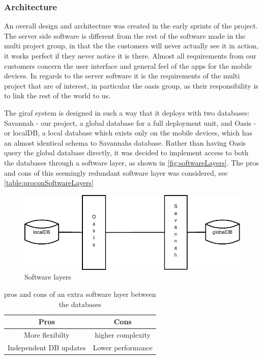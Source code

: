 \subsubsection*{Architecture}
An overall design and architecture was created in the early sprints of the project.
The server side software is different from the rest of the software made in the multi project group, in that the the customers will never actually see it in action, it works perfect if they never notice it is there.
Almost all requirements from our customers concern the user interface and general feel of the apps for the mobile devices. In regards to the server software it is the requirements of the multi project that are of interest,
in particular the oasis group, as their responsibility is to link the rest of the world to us.

The giraf system is designed in such a way that it deploys with two databases: Savannah - our project, a global database for a full deployment unit, and Oasis - or localDB, a local database which exists only
on the mobile devices, which has an almost identical schema to Savannahs database.
Rather than having Oasis query the global database directly, it was decided to implement access to both the databases through a software layer, as shown in \autoref{fig:softwareLayers}.
The pros and cons of this seemingly redundant software layer was considered, see \autoref{table:proconSoftwareLayers}

\begin{figure}[H]
	\centering
		\includegraphics[scale=1]{images/softwareLayers}
	\caption{Software layers}
	\label{fig:softwareLayers}
\end{figure}

\begin{table}[H]
  \begin{center}
    \begin{tabular}{c|c}
    Pros                   &             Cons \\
    \hline
    More flexibilty        & higher complexity\\
    Independent DB updates & Lower performance\\
    \end{tabular}
    \caption{pros and cons of an extra software layer between the databases}
    \label{table:proconSoftwareLayers}
  \end{center}
\end{table}

